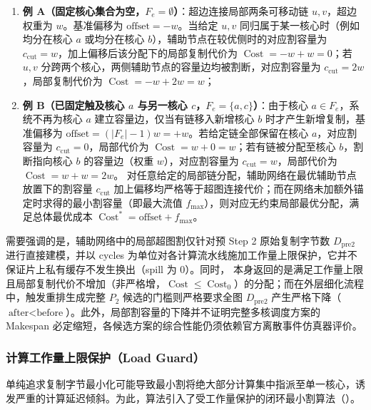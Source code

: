 \documentclass[anonymous,withtoc]{gmcm2026}
\providecommand{\tightlist}{\setlength{\itemsep}{0pt}\setlength{\parskip}{0pt}}
\begin{document}
\begin{enumerate}
\def\labelenumi{\arabic{enumi}.}
\tightlist
\item
  \textbf{例 A（固定核心集合为空，\(F_e = \emptyset\)）}：超边连接局部两条可移动链 \(u, v\)，超边权重为 \(w\)。基准偏移为 \(\text{offset} = -w\)。当给定 \(u, v\) 同归属于某一核心时（例如均分在核心 \(a\) 或均分在核心 \(b\)），辅助节点在较优侧时的对应割容量为 \(c_{\mathrm{cut}} = w\)，加上偏移后该分配下的局部复制代价为 \(\operatorname{Cost} = -w + w = 0\)；若 \(u, v\) 分跨两个核心，两侧辅助节点的容量边均被割断，对应割容量为 \(c_{\mathrm{cut}} = 2w\)，局部复制代价为 \(\operatorname{Cost} = -w + 2w = w\)；
\item
  \textbf{例 B（已固定触及核心 \(a\) 与另一核心 \(c\)，\(F_e = \{a, c\}\)）}：由于核心 \(a \in F_e\)，系统不再为核心 \(a\) 建立容量边，仅当有链移入新增核心 \(b\) 时才产生新增复制，基准偏移为 \(\text{offset} = (|F_e| - 1)w = +w\)。若给定链全部保留在核心 \(a\)，对应割容量为 \(c_{\mathrm{cut}} = 0\)，局部代价为 \(\operatorname{Cost} = w + 0 = w\)；若有链被分配至核心 \(b\)，割断指向核心 \(b\) 的容量边（权重 \(w\)），对应割容量为 \(c_{\mathrm{cut}} = w\)，局部代价为 \(\operatorname{Cost} = w + w = 2w\)。 对任意给定的局部链分配，辅助网络在最优辅助节点放置下的割容量 \(c_{\mathrm{cut}}\) 加上偏移均严格等于超图连接代价；而在网络未加额外锚定时求得的最小割容量（即最大流值 \(f_{\max}\)），则对应无约束局部最优分配，满足总体最优成本 \(\operatorname{Cost}^* = \text{offset} + f_{\max}\)。
\end{enumerate}

需要强调的是，辅助网络中的局部超图割仅针对预 Step 2 原始复制字节数 \(D_{\mathrm{pre2}}\) 进行直接建模，并以 cycles 为单位对各计算流水线施加工作量上限保护，它并不保证片上私有缓存不发生换出（spill 为 0）。同时，\texttt{} 本身返回的是满足工作量上限且局部复制代价不增加（非严格增，\(\operatorname{Cost} \le \operatorname{Cost}_0\)）的分配；而在外层细化流程 \texttt{} 中，触发重排生成完整 \(P_2\) 候选的门槛则严格要求全图 \(D_{\mathrm{pre2}}\) 产生严格下降（\(\text{after} < \text{before}\)）。此外，局部割容量的下降并不证明完整多核调度方案的 Makespan 必定缩短，各候选方案的综合性能仍须依赖官方离散事件仿真器评价。

\subsubsection{计算工作量上限保护（Load Guard）}

单纯追求复制字节最小化可能导致最小割将绝大部分计算集中指派至单一核心，诱发严重的计算延迟倾斜。为此，算法引入了受工作量保护的闭环最小割算法（\texttt{}）。
\end{document}
